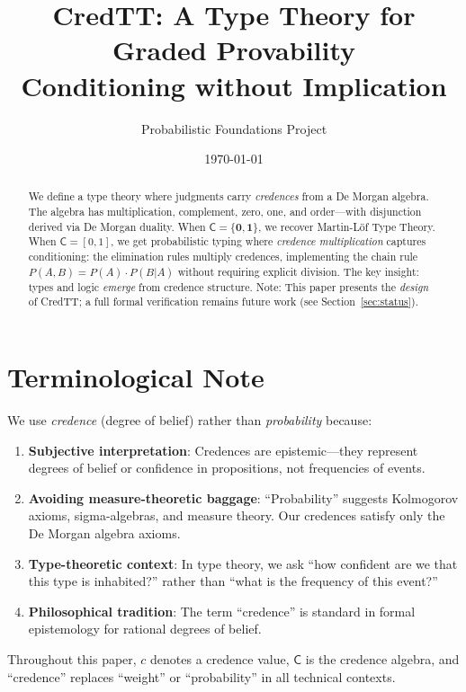 \documentclass[11pt,a4paper]{article}
\title{CredTT: A Type Theory for Graded Provability\\[0.5em]
\large Conditioning without Implication}
\author{Probabilistic Foundations Project}
\date{\today}
\newcommand{\C}{\mathsf{C}}
\newcommand{\one}{\mathbf{1}}
\newcommand{\zero}{\mathbf{0}}
\begin{document}
\maketitle

\begin{abstract}
We define a type theory where judgments carry \emph{credences} from a De Morgan algebra. The algebra has multiplication, complement, zero, one, and order---with disjunction derived via De Morgan duality. When $\C = \{\zero, \one\}$, we recover Martin-L\"of Type Theory. When $\C = {[0,1]}$, we get probabilistic typing where \emph{credence multiplication} captures conditioning: the elimination rules multiply credences, implementing the chain rule $P(A,B) = P(A) \cdot P(B|A)$ without requiring explicit division. The key insight: types and logic \emph{emerge} from credence structure. Note: This paper presents the \emph{design} of CredTT; a full formal verification remains future work (see Section~\ref{sec:status}).
\end{abstract}

\section*{Terminological Note}

We use \emph{credence} (degree of belief) rather than \emph{probability} because:
\begin{enumerate}
    \item \textbf{Subjective interpretation}: Credences are epistemic---they represent degrees of belief or confidence in propositions, not frequencies of events.
    \item \textbf{Avoiding measure-theoretic baggage}: ``Probability'' suggests Kolmogorov axioms, sigma-algebras, and measure theory. Our credences satisfy only the De Morgan algebra axioms.
    \item \textbf{Type-theoretic context}: In type theory, we ask ``how confident are we that this type is inhabited?'' rather than ``what is the frequency of this event?''
    \item \textbf{Philosophical tradition}: The term ``credence'' is standard in formal epistemology for rational degrees of belief.
\end{enumerate}

Throughout this paper, $c$ denotes a credence value, $\C$ is the credence algebra, and ``credence'' replaces ``weight'' or ``probability'' in all technical contexts.

\tableofcontents
\end{document}
